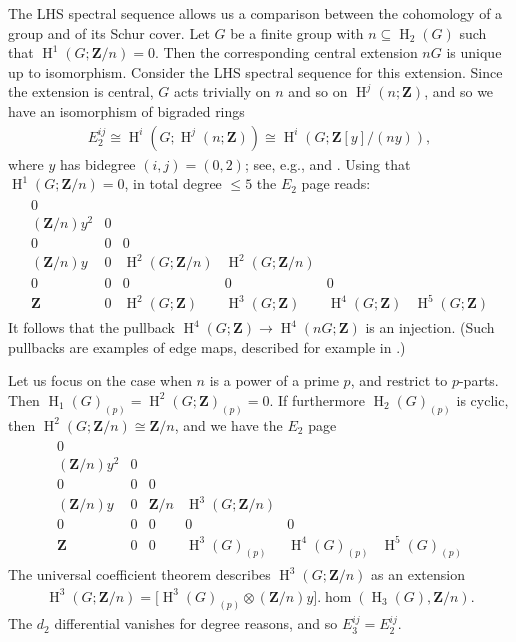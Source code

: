 \documentclass[pdftex]{sigma}
\numberwithin{equation}{section}
\newcommand\bZ{\mathbf Z}
\DeclareMathOperator\homology{H}
\renewcommand\H{\homology}
\newcommand\<\langle
\renewcommand\>\rangle
\begin{document}
{The LHS spectral sequence allows us a comparison between the cohomology of a group and of its Schur cover.
Let $G$ be a finite group with $n \subseteq \H_2(G)$ such that $\H^1(G; \bZ/n) = 0$.
Then the corresponding central extension $nG$ is unique up to isomorphism. Consider the LHS spectral sequence for this extension.
Since the extension is central, $G$ acts trivially on $n$ and so on $\H^j(n; \bZ)$, and so we have an isomorphism of bigraded rings
\begin{gather*} E_2^{ij} \cong \H^i(G; \H^j(n;\bZ)) \cong \H^i(G; \bZ[y]/(ny)), \end{gather*}
where $y$ has bidegree $(i,j) = (0,2)$; see, e.g., \cite[Section~II.8]{SerresThesis} and \cite[Section~II.5]{HochschildSerre}.
Using that $\H^1(G;\bZ/n) = 0$, in total degree $\leq 5$ the $E_2$ page reads:
\begin{gather*}
\begin{array}{cccccc}
0 \\
(\bZ/n)y^2 & 0 \\
0 & 0 & 0\\
(\bZ/n)y & 0 & \H^2(G;\bZ/n) & \H^2(G;\bZ/n) \\
0 & 0 & 0 & 0 & 0 \\
\bZ & 0 & \H^2(G;\bZ) & \H^3(G;\bZ) & \H^4(G;\bZ) & \H^5(G;\bZ)
\end{array}
\end{gather*}
It follows that the pullback $\H^4(G;\bZ) \to \H^4(nG;\bZ)$ is an injection. (Such pullbacks are examples of edge maps, described for example in \cite[Section~6.8.2]{MR1269324}.)}

Let us focus on the case when $n$ is a power of a prime $p$, and restrict to $p$-parts. Then $\H_1(G)_{(p)} = \H^2(G;\bZ)_{(p)} = 0$. If furthermore $\H_2(G)_{(p)}$ is cyclic, then $\H^2(G;\bZ/n) \cong \bZ/n$, and we have the $E_2$ page
\begin{gather*}
\begin{array}{cccccc}
0 \\
(\bZ/n)y^2 & 0 \\
0 & 0 & 0\\
(\bZ/n)y & 0 & \bZ/n & \H^3(G;\bZ/n) \\
0 & 0 & 0 & 0 & 0 \\
\bZ & 0 & 0 & \H^3(G)_{(p)} & \H^4(G)_{(p)} & \H^5(G)_{(p)}
\end{array}
\end{gather*}
The universal coefficient theorem describes $\H^3(G;\bZ/n)$ as an extension
\begin{gather*} \H^3(G;\bZ/n) = \bigl[ \H^3(G)_{(p)} \otimes (\bZ/n)y \bigr].\hom(\H_3(G), \bZ/n).\end{gather*}
The $d_2$ differential vanishes for degree reasons, and so $E_3^{ij} = E_2^{ij}$.
\end{document}
